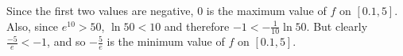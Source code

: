 \documentclass[nooutcomes]{ximera}
\renewenvironment{freeResponse}{
\ifhandout\setbox0\vbox\bgroup\else
\begin{trivlist}\item[\hskip \labelsep\bfseries Solution:\hspace{2ex}]
\fi}
{\ifhandout\egroup\else
\end{trivlist}
\fi}
\begin{document}
\begin{problem}
\begin{enumerate}
\begin{freeResponse}
				Since the first two values are negative, $0$ is the maximum value of $f$ on $[0.1,5]$.  Also, since $e^{10} > 50$, $\ln 50 < 10$ and therefore $-1 < -\frac{1}{10} \ln 50$.  But clearly $\frac{-5}{e} < -1$, and so $- \frac{5}{e}$ is the minimum value of $f$ on $[0.1, 5]$.  
				
				\end{freeResponse}
				
			\end{enumerate}

\end{problem}
\end{document}
